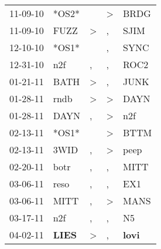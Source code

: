 \begin{supertabular}{p{0.07\textwidth}p{0.06\textwidth}p{0.02\textwidth}p{0.02\textwidth}p{0.06\textwidth}}
          11-09-10\textsuperscript{} &                            *OS2* &                  &     \textgreater &           BRDG\textsuperscript{} \\
          11-09-10\textsuperscript{} &           FUZZ\textsuperscript{} &     \textgreater &                , &           SJIM\textsuperscript{} \\
          12-10-10\textsuperscript{} &                            *OS1* &                  &                , &           SYNC\textsuperscript{} \\
          12-31-10\textsuperscript{} &            n2f\textsuperscript{} &                , &                , &           ROC2\textsuperscript{} \\
          01-21-11\textsuperscript{} &           BATH\textsuperscript{} &     \textgreater &                , &           JUNK\textsuperscript{} \\
          01-28-11\textsuperscript{} &           rndb\textsuperscript{} &     \textgreater &     \textgreater &           DAYN\textsuperscript{} \\
          01-28-11\textsuperscript{} &           DAYN\textsuperscript{} &                , &     \textgreater &            n2f\textsuperscript{} \\
          02-13-11\textsuperscript{} &                            *OS1* &                  &     \textgreater &           BTTM\textsuperscript{} \\
          02-13-11\textsuperscript{} &           3WID\textsuperscript{} &                , &     \textgreater &           peep\textsuperscript{} \\
          02-20-11\textsuperscript{} &           botr\textsuperscript{} &                , &                , &           MITT\textsuperscript{} \\
          03-06-11\textsuperscript{} &           reso\textsuperscript{} &                , &                , &            EX1\textsuperscript{} \\
          03-06-11\textsuperscript{} &           MITT\textsuperscript{} &                , &     \textgreater &           MANS\textsuperscript{} \\
          03-17-11\textsuperscript{} &            n2f\textsuperscript{} &                , &                , &             N5\textsuperscript{} \\
          04-02-11\textsuperscript{} &  \textbf{LIES\textsuperscript{}} &     \textgreater &                , &  \textbf{lovi\textsuperscript{}} \\

\end{supertabular}
